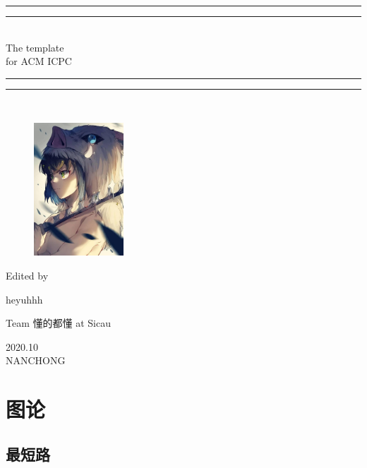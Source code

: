 \documentclass[a4paper,11pt,twoside,fontset = fandol,UTF8]{ctexbook} %
\begin{document}
 
	\begin{titlepage}       %
		\centering
		\vspace*{\baselineskip}
		\rule{\textwidth}{1.6pt}\vspace*{-\baselineskip}\vspace*{2pt}
		\rule{\textwidth}{0.4pt}\\[\baselineskip]
		{\LARGE The template\\[\baselineskip]\small for ACM ICPC}
		\\[0.2\baselineskip]
		\rule{\textwidth}{0.4pt}\vspace*{-\baselineskip}\vspace{3.2pt}
		\rule{\textwidth}{1.6pt}\\[\baselineskip]
		\scshape
		
		\begin{figure}[!htb]
			\centering
			\includegraphics[width=0.3\textwidth]{icpc}    %
		\end{figure}
		
		\vspace*{3\baselineskip}
		Edited by \\[\baselineskip] {heyuhhh\par}
		{Team \Large 懂的都懂 \normalsize{at Sicau}\par }
		\vfill
		{\scshape 2020.10} \\{\large NANCHONG}\par
	\end{titlepage}
	\newpage            %
	\tableofcontents     %
	\chapter{图论}    %
	\setcounter{page}{1} %
	\section{最短路}   %
\end{document}

